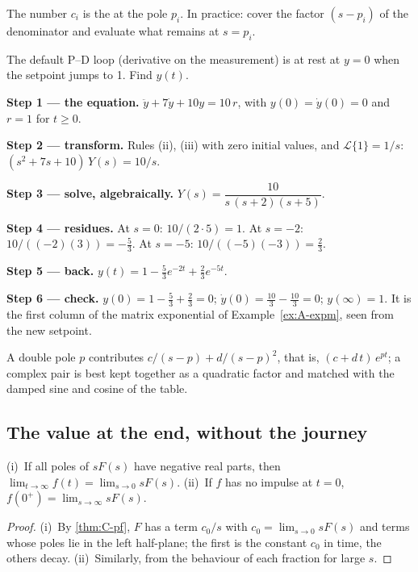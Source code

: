 The number $c_i$ is the  at the pole $p_i$. In practice: cover the factor $(s - p_i)$ of the denominator and evaluate what remains at $s = p_i$.

\begin{example}
\label{ex:C-step}
The default P–D loop (derivative on the measurement) is at rest at $y = 0$ when the setpoint jumps to 1. Find $y(t)$.

\textbf{Step 1 — the equation.} $\ddot y + 7\dot y + 10y = 10\,r$, with $y(0) = \dot y(0) = 0$ and $r = 1$ for $t \ge 0$.

\textbf{Step 2 — transform.} Rules (ii), (iii) with zero initial values, and $\mathcal{L}\{1\} = 1/s$: $(s^2 + 7s + 10)\,Y(s) = 10/s$.

\textbf{Step 3 — solve, algebraically.} $Y(s) = \dfrac{10}{s\,(s + 2)(s + 5)}$.

\textbf{Step 4 — residues.} At $s = 0$: $10/(2 \cdot 5) = 1$. At $s = -2$: $10/((-2)(3)) = -\tfrac53$. At $s = -5$: $10/((-5)(-3)) = \tfrac23$.

\textbf{Step 5 — back.} $y(t) = 1 - \tfrac53e^{-2t} + \tfrac23e^{-5t}$.

\textbf{Step 6 — check.} $y(0) = 1 - \tfrac53 + \tfrac23 = 0$; $\dot y(0) = \tfrac{10}{3} - \tfrac{10}{3} = 0$; $y(\infty) = 1$. It is the first column of the matrix exponential of Example~\ref{ex:A-expm}, seen from the new setpoint.
\end{example}

A double pole $p$ contributes $c/(s - p) + d/(s - p)^2$, that is, $(c + d\,t)\,e^{pt}$; a complex pair is best kept together as a quadratic factor and matched with the damped sine and cosine of the table.

\subsection{The value at the end, without the journey}

\begin{theorem}
\label{thm:C-fvt}
(i)~If all poles of $sF(s)$ have negative real parts, then $\lim_{t \to \infty} f(t) = \lim_{s \to 0} sF(s)$. (ii)~If $f$ has no impulse at $t = 0$, $f(0^+) = \lim_{s \to \infty} sF(s)$.
\end{theorem}
\begin{proof}
(i)~By \cref{thm:C-pf}, $F$ has a term $c_0/s$ with $c_0 = \lim_{s \to 0}sF(s)$ and terms whose poles lie in the left half-plane; the first is the constant $c_0$ in time, the others decay. (ii)~Similarly, from the behaviour of each fraction for large $s$.
\end{proof}

